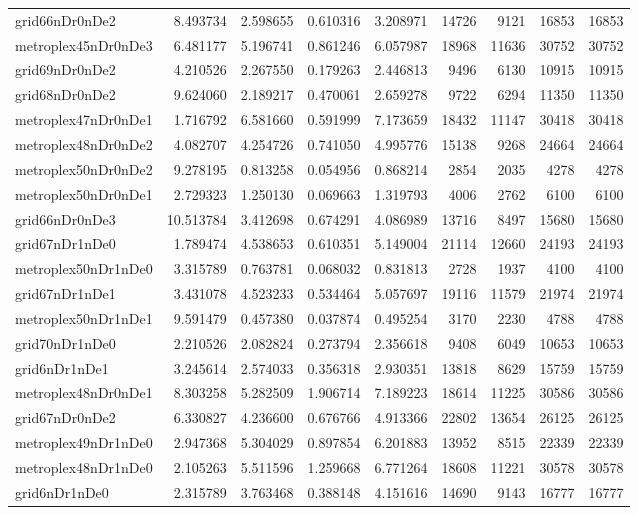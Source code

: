 \begin{longtable}{|l|r|r|r|r|r|r|r|r|}
grid66nDr0nDe2 & 8.493734 & 2.598655 & 0.610316 & 3.208971 & 14726 & 9121 & 16853 & 16853 \\
metroplex45nDr0nDe3 & 6.481177 & 5.196741 & 0.861246 & 6.057987 & 18968 & 11636 & 30752 & 30752 \\
grid69nDr0nDe2 & 4.210526 & 2.267550 & 0.179263 & 2.446813 & 9496 & 6130 & 10915 & 10915 \\
grid68nDr0nDe2 & 9.624060 & 2.189217 & 0.470061 & 2.659278 & 9722 & 6294 & 11350 & 11350 \\
metroplex47nDr0nDe1 & 1.716792 & 6.581660 & 0.591999 & 7.173659 & 18432 & 11147 & 30418 & 30418 \\
metroplex48nDr0nDe2 & 4.082707 & 4.254726 & 0.741050 & 4.995776 & 15138 & 9268 & 24664 & 24664 \\
metroplex50nDr0nDe2 & 9.278195 & 0.813258 & 0.054956 & 0.868214 & 2854 & 2035 & 4278 & 4278 \\
metroplex50nDr0nDe1 & 2.729323 & 1.250130 & 0.069663 & 1.319793 & 4006 & 2762 & 6100 & 6100 \\
grid66nDr0nDe3 & 10.513784 & 3.412698 & 0.674291 & 4.086989 & 13716 & 8497 & 15680 & 15680 \\
grid67nDr1nDe0 & 1.789474 & 4.538653 & 0.610351 & 5.149004 & 21114 & 12660 & 24193 & 24193 \\
metroplex50nDr1nDe0 & 3.315789 & 0.763781 & 0.068032 & 0.831813 & 2728 & 1937 & 4100 & 4100 \\
grid67nDr1nDe1 & 3.431078 & 4.523233 & 0.534464 & 5.057697 & 19116 & 11579 & 21974 & 21974 \\
metroplex50nDr1nDe1 & 9.591479 & 0.457380 & 0.037874 & 0.495254 & 3170 & 2230 & 4788 & 4788 \\
grid70nDr1nDe0 & 2.210526 & 2.082824 & 0.273794 & 2.356618 & 9408 & 6049 & 10653 & 10653 \\
grid6nDr1nDe1 & 3.245614 & 2.574033 & 0.356318 & 2.930351 & 13818 & 8629 & 15759 & 15759 \\
metroplex48nDr0nDe1 & 8.303258 & 5.282509 & 1.906714 & 7.189223 & 18614 & 11225 & 30586 & 30586 \\
grid67nDr0nDe2 & 6.330827 & 4.236600 & 0.676766 & 4.913366 & 22802 & 13654 & 26125 & 26125 \\
metroplex49nDr1nDe0 & 2.947368 & 5.304029 & 0.897854 & 6.201883 & 13952 & 8515 & 22339 & 22339 \\
metroplex48nDr1nDe0 & 2.105263 & 5.511596 & 1.259668 & 6.771264 & 18608 & 11221 & 30578 & 30578 \\
grid6nDr1nDe0 & 2.315789 & 3.763468 & 0.388148 & 4.151616 & 14690 & 9143 & 16777 & 16777 \\

\end{longtable}
